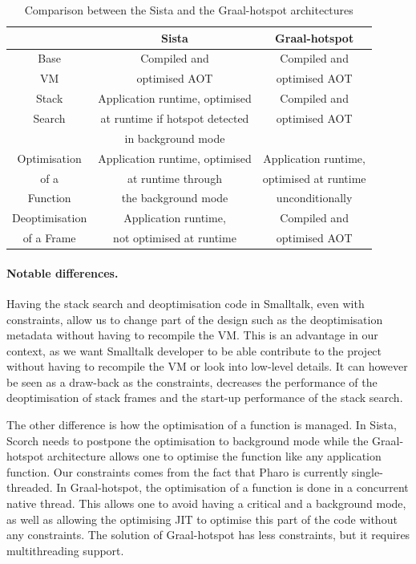 \documentclass[a4paper,12pt,twoside]{../includes/ThesisStyle}
\begin{document}
\begin{table}
  \caption{Comparison between the Sista and the Graal-hotspot architectures}
  \vspace{0.1cm}
  \centering
  \begin{tabular}{c||c|c}
    \toprule
    & Sista & Graal-hotspot \\
    \midrule
    \midrule
	Base & Compiled and & Compiled and \\
	VM & optimised AOT & optimised AOT \\
    \midrule
	Stack & Application runtime, optimised & Compiled and \\
	Search & at runtime if hotspot detected & optimised AOT \\
	 & in background mode & \\
    \midrule
	Optimisation & Application runtime, optimised & Application runtime,\\
	of a & at runtime through & optimised at runtime \\
	Function & the background mode & unconditionally \\
    \midrule
	Deoptimisation & Application runtime, & Compiled and \\
	of a Frame & not optimised at runtime & optimised AOT \\
	\bottomrule
  \end{tabular}
  \label{tbl:comparison}
\end{table}

\paragraph{Notable differences.}Having the stack search and deoptimisation code in Smalltalk, even with constraints, allow us to change part of the design such as the deoptimisation metadata without having to recompile the VM. This is an advantage in our context, as we want Smalltalk developer to be able contribute to the project without having to recompile the VM or look into low-level details. It can however be seen as a draw-back as the constraints, decreases the performance of the deoptimisation of stack frames and the start-up performance of the stack search.

The other difference is how the optimisation of a function is managed. In Sista, Scorch needs to postpone the optimisation to background mode while the Graal-hotspot architecture allows one to optimise the function like any application function. Our constraints comes from the fact that Pharo is currently single-threaded. In Graal-hotspot, the optimisation of a function is done in a concurrent native thread. This allows one to avoid having a critical and a background mode, as well as allowing the optimising JIT to optimise this part of the code without any constraints. The solution of Graal-hotspot has less constraints, but it requires multithreading support.
\end{document}
